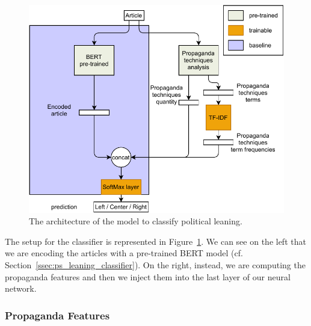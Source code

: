 \begin{figure}[!htbp]
    \centering
    \includegraphics[width=\linewidth]{figures/methodology-Page-1.pdf}
    \caption{The architecture of the model to classify political leaning.}
    \label{fig:model_classifier}
\end{figure}

The setup for the classifier is represented in Figure~\ref{fig:model_classifier}. We can see on the left that we are encoding the articles with a pre-trained BERT model (cf. Section~\ref{ssec:ps_leaning_classifier}). On the right, instead, we are computing the propaganda features and then we inject them into the last layer of our neural network.


\subsubsection{Propaganda Features}


